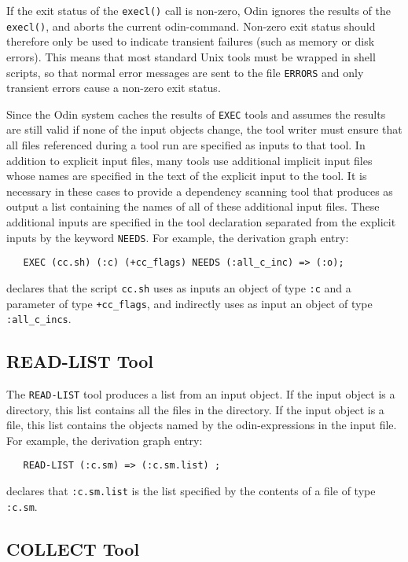 \documentclass[hidelinks]{report}
\newcommand{\ex}{\tt}   %
\begin{document}
If the exit status of the {\ex execl()} call is non-zero,
Odin ignores the results of the {\ex execl()},
and aborts the current odin-command.
Non-zero exit status should therefore only be used to indicate
transient failures (such as memory or disk errors).
This means that most standard Unix tools must be wrapped in shell scripts,
so that normal error messages are sent to the file {\ex ERRORS}
and only transient errors cause a non-zero exit status.

Since the Odin system caches the results of {\ex EXEC} tools
and assumes the results are still valid if none of the input objects change,
the tool writer must ensure that all files referenced during a tool run
are specified as inputs to that tool.
In addition to explicit input files,
many tools use additional implicit input files whose names are specified
in the text of the explicit input to the tool.
It is necessary in these cases to provide a dependency scanning tool
that produces as output a list containing the names of all of these
additional input files.
These additional inputs are specified in the tool declaration
separated from the explicit inputs by the keyword {\ex NEEDS}.
For example, the derivation graph entry:
\begin{verbatim}
   EXEC (cc.sh) (:c) (+cc_flags) NEEDS (:all_c_inc) => (:o);
\end{verbatim}
declares that the script {\ex cc.sh} uses as inputs an object of type {\ex :c}
and a parameter of type {\ex +cc\_flags},
and indirectly uses as input an object of type {\ex :all\_c\_incs}.

\subsection{READ-LIST Tool}

The {\ex READ-LIST} tool produces a list from an input object.
If the input object is a directory, this list contains all the files in
the directory.
If the input object is a file, this list contains
the objects named by the odin-expressions in the input file.
For example, the derivation graph entry:
\begin{verbatim}
   READ-LIST (:c.sm) => (:c.sm.list) ;
\end{verbatim}
declares that {\ex :c.sm.list} is the list specified by the contents of
a file of type {\ex :c.sm}.

\subsection{COLLECT Tool}
\end{document}
